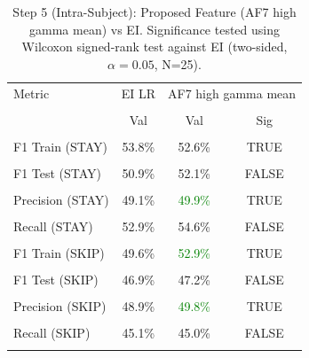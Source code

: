 \begin{table}[H]
\centering
\begin{tabular}{lccc}
\hline
Metric & EI LR & \multicolumn{2}{c}{AF7 high gamma mean} \\\\
 & Val & Val & Sig \\\\
\hline
F1 Train (STAY) & 53.8\% & 52.6\% & TRUE \\\\
F1 Test (STAY) & 50.9\% & 52.1\% & FALSE \\\\
Precision (STAY) & 49.1\% & \textcolor{green}{49.9\%} & TRUE \\\\
Recall (STAY) & 52.9\% & 54.6\% & FALSE \\\\
F1 Train (SKIP) & 49.6\% & \textcolor{green}{52.9\%} & TRUE \\\\
F1 Test (SKIP) & 46.9\% & 47.2\% & FALSE \\\\
Precision (SKIP) & 48.9\% & \textcolor{green}{49.8\%} & TRUE \\\\
Recall (SKIP) & 45.1\% & 45.0\% & FALSE \\\\
\hline
\end{tabular}
\caption{Step 5 (Intra-Subject): Proposed Feature (AF7 high gamma mean) vs EI. Significance tested using Wilcoxon signed-rank test against EI (two-sided, $\alpha=0.05$, N=25).}
\label{tab:metrics_5_intra_1}
\end{table}